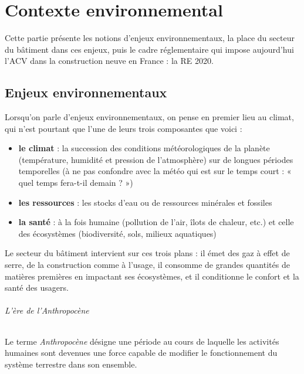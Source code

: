 \part{Contexte environnemental}

Cette partie présente les notions d'enjeux environnementaux, la place du secteur du bâtiment dans ces enjeux, puis le cadre réglementaire qui impose aujourd'hui l'ACV dans la construction neuve en France : la RE 2020.

\chapter{Enjeux environnementaux}

 
Lorsqu'on parle d'enjeux environnementaux, on pense en premier lieu au climat, qui n'est pourtant que l'une de leurs trois composantes que voici :
 
\begin{itemize}
    \item \textbf{le climat} : la succession des conditions météorologiques de la planète (température, humidité et pression de l'atmosphère) sur de longues périodes temporelles (à ne pas confondre avec la météo qui est sur le temps court : « quel temps fera-t-il demain ? »)
    \item \textbf{les ressources} : les stocks d'eau ou de
    ressources minérales et fossiles
    \item \textbf{la santé} : à la fois humaine
    (pollution de l'air, îlots de chaleur, etc.) et celle des écosystèmes (biodiversité, sols, milieux aquatiques)
\end{itemize}
 
Le secteur du bâtiment intervient sur ces trois plans : il émet des gaz à effet de serre, de la construction comme à l'usage, il consomme de grandes quantités de matières premières en impactant ses écosystèmes, et il conditionne le confort et la santé des usagers.

\paragraph{L'ère de l'Anthropocène}
Le terme \emph{Anthropocène} désigne une période au cours de laquelle les activités humaines sont devenues une force capable de modifier le fonctionnement du système terrestre dans son ensemble.
 
